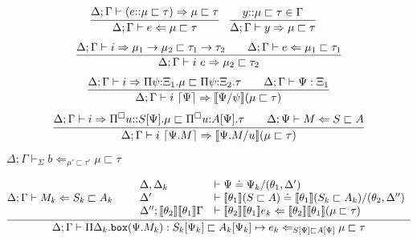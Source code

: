 \documentclass[letterpaper, 11pt]{article}
\newcommand{\Rar}{\Rightarrow}
\newcommand{\Lar}{\Leftarrow}
\newcommand{\rar}{\rightarrow}
\newcommand{\bbox}{\texttt{box}}
\begin{document}
    \begin{align*}
      & \infer{ \Delta; \Gamma \vdash e \Lar \mu \sqsubset \tau}
        {
           \Delta; \Gamma \vdash (e {::} \mu \sqsubset \tau) \Rar \mu \sqsubset \tau
        } &
      & \infer{ \Delta; \Gamma \vdash y \Rar \mu \sqsubset \tau}{y{::}\mu \sqsubset \tau \in \Gamma}
    \end{align*}
    \begin{align*}
      \infer{ \Delta; \Gamma \vdash i \ e \Rar \mu_2 \sqsubset \tau_2}
            {
               \Delta; \Gamma \vdash i \Rar \mu_1 \rar \mu_2 \sqsubset \tau_1 \rar \tau_2
              &&
               \Delta; \Gamma \vdash e \Lar \mu_1 \sqsubset \tau_1
            }
    \end{align*}
    \begin{align*}
      \infer{ \Delta; \Gamma \vdash i \ \lceil \Psi \rceil \Rar \llbracket \Psi/\psi \rrbracket (\mu \sqsubset \tau)}
            {
               \Delta; \Gamma \vdash i \Rar \Pi \psi{:}\Xi_1. \mu \sqsubset \Pi \psi{:}\Xi_2. \tau
              &&
               \Delta; \Gamma \vdash \Psi : \Xi_1
            }
    \end{align*}
    \begin{align*}
      \infer{ \Delta; \Gamma \vdash i \ \lceil \Psi. M \rceil \Rar \llbracket \Psi. M / u \rrbracket (\mu \sqsubset \tau)}
            {
               \Delta; \Gamma \vdash i \Rar \Pi^\square u{::}S[\Psi]. \mu \sqsubset \Pi^\square u{:}A[\Psi]. \tau
              &&
               \Delta; \Psi \vdash M \Lar S \sqsubset A
            }
    \end{align*}

    $\boxed{ \Delta; \Gamma \vdash_\Sigma b \Lar_{\mu' \sqsubset \tau'} \mu \sqsubset \tau}$

    \begin{align*}
      \infer{ \Delta; \Gamma \vdash \Pi \Delta_k . \bbox(\Psi. M_k) : S_k[\Psi_k]  \sqsubset A_k[\Psi_k] \mapsto e_k 
                                                \Lar_{S[\Psi] \sqsubset A[\Psi]} \mu \sqsubset \tau}
            {
               \Delta; \Gamma \vdash M_k \Lar S_k \sqsubset A_k
              &&
              \begin{array}{ll}
                 \Delta, \Delta_k & \vdash \Psi \doteq \Psi_k / (\theta_1, \Delta') \\
                 \Delta'          & \vdash \llbracket \theta_1 \rrbracket ( S \sqsubset A) \doteq 
                                                  \llbracket \theta_1 \rrbracket(S_k \sqsubset A_k)/(\theta_2, \Delta'') \\
                 \Delta'';\llbracket \theta_2 \rrbracket \llbracket \theta_1 \rrbracket \Gamma & \vdash
                                        \llbracket \theta_2 \rrbracket \llbracket \theta_1 \rrbracket e_k 
                                        \Lar \llbracket \theta_2 \rrbracket \llbracket \theta_1 \rrbracket (\mu \sqsubset \tau)
              \end{array}
            }
    \end{align*}
\end{document}
